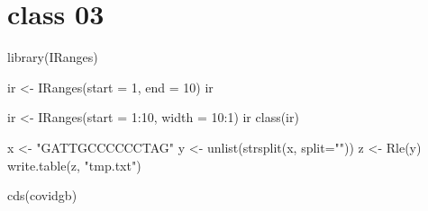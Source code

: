 \documentclass[
]{book}
\newenvironment{Shaded}{\begin{snugshade}}{\end{snugshade}}
\newcommand{\AttributeTok}[1]{\textcolor[rgb]{0.77,0.63,0.00}{#1}}
\newcommand{\DecValTok}[1]{\textcolor[rgb]{0.00,0.00,0.81}{#1}}
\newcommand{\FunctionTok}[1]{\textcolor[rgb]{0.00,0.00,0.00}{#1}}
\newcommand{\NormalTok}[1]{#1}
\newcommand{\OtherTok}[1]{\textcolor[rgb]{0.56,0.35,0.01}{#1}}
\newcommand{\SpecialCharTok}[1]{\textcolor[rgb]{0.00,0.00,0.00}{#1}}
\newcommand{\StringTok}[1]{\textcolor[rgb]{0.31,0.60,0.02}{#1}}
\begin{document}
\hypertarget{class-03-4}{%
\section{class 03}\label{class-03-4}}

\begin{Shaded}
\begin{Highlighting}[]
\FunctionTok{library}\NormalTok{(IRanges)}

\NormalTok{ir }\OtherTok{\textless{}{-}} \FunctionTok{IRanges}\NormalTok{(}\AttributeTok{start =} \DecValTok{1}\NormalTok{, }\AttributeTok{end =} \DecValTok{10}\NormalTok{)}
\NormalTok{ir}

\NormalTok{ir }\OtherTok{\textless{}{-}} \FunctionTok{IRanges}\NormalTok{(}\AttributeTok{start =} \DecValTok{1}\SpecialCharTok{:}\DecValTok{10}\NormalTok{, }\AttributeTok{width =} \DecValTok{10}\SpecialCharTok{:}\DecValTok{1}\NormalTok{)}
\NormalTok{ir}
\FunctionTok{class}\NormalTok{(ir)}

\NormalTok{x }\OtherTok{\textless{}{-}} \StringTok{"GATTGCCCCCCTAG"}
\NormalTok{y }\OtherTok{\textless{}{-}} \FunctionTok{unlist}\NormalTok{(}\FunctionTok{strsplit}\NormalTok{(x, }\AttributeTok{split=}\StringTok{""}\NormalTok{))}
\NormalTok{z }\OtherTok{\textless{}{-}} \FunctionTok{Rle}\NormalTok{(y)}
\FunctionTok{write.table}\NormalTok{(z, }\StringTok{"tmp.txt"}\NormalTok{)}
\end{Highlighting}
\end{Shaded}

\begin{Shaded}
\begin{Highlighting}[]
\FunctionTok{cds}\NormalTok{(covidgb)}
\end{Highlighting}
\end{Shaded}
\end{document}
